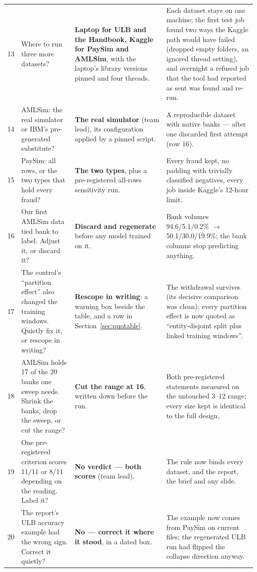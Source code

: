 \documentclass[11pt]{article}
\begin{document}
{\begin{xltabular}{\linewidth}{@{}p{0.35cm} >{\raggedright\arraybackslash}p{3.1cm} >{\raggedright\arraybackslash}p{4.4cm} X@{}}
13 & Where to run three more datasets? & \textbf{Laptop for ULB and the Handbook, Kaggle for PaySim and AMLSim}, with the laptop's library versions pinned and four threads. & Each dataset stays on one machine; the first test job found two ways the Kaggle path would have failed (dropped empty folders, an ignored thread setting), and overnight a refused job that the tool had reported as sent was found and re-run. \\
14 & AMLSim: the real simulator or IBM's pre-generated substitute? & \textbf{The real simulator} (team lead), its configuration applied by a pinned script. & A reproducible dataset with native banks --- after one discarded first attempt (row 16). \\
15 & PaySim: all rows, or the two types that hold every fraud? & \textbf{The two types}, plus a pre-registered all-rows sensitivity run. & Every fraud kept, no padding with trivially classified negatives, every job inside Kaggle's 12-hour limit. \\
16 & Our first AMLSim data tied bank to label. Adjust it, or discard it? & \textbf{Discard and regenerate} before any model trained on it. & Bank volumes 94.6/5.1/0.2\% $\to$ 50.1/30.0/19.9\%; the bank columns stop predicting anything. \\
17 & The control's ``partition effect'' also changed the training windows. Quietly fix it, or rescope in writing? & \textbf{Rescope in writing}: a warning box beside the table, and a row in Section~\ref{sec:quotable}. & The withdrawal survives (its decisive comparison was clean); every partition effect is now quoted as ``entity-disjoint split plus linked training windows''. \\
18 & AMLSim holds 17 of the 20 banks one sweep needs. Shrink the banks, drop the sweep, or cut the range? & \textbf{Cut the range at 16}, written down before the run. & Both pre-registered statements measured on the untouched 3--12 range; every size kept is identical to the full design. \\
19 & One pre-registered criterion scores 11/11 or 8/11 depending on the reading. Label it? & \textbf{No verdict --- both scores} (team lead). & The rule now binds every dataset, and the report, the brief and any slide. \\
20 & The report's ULB accuracy example had the wrong sign. Correct it quietly? & \textbf{No --- correct it where it stood}, in a dated box. & The example now comes from PaySim on current files; the regenerated ULB run had flipped the collapse direction anyway. \\

\end{xltabular}}
\end{document}
